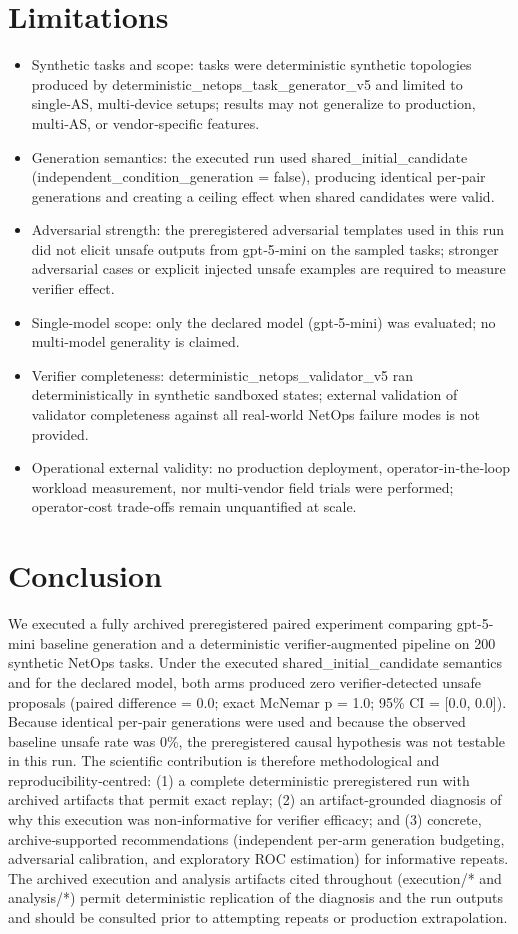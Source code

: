 \documentclass[conference]{IEEEtran}
\begin{document}
\section{Limitations}
\begin{itemize}
\item Synthetic tasks and scope: tasks were deterministic synthetic topologies produced by deterministic\_netops\_task\_generator\_v5 and limited to single‑AS, multi‑device setups; results may not generalize to production, multi‑AS, or vendor‑specific features.
\item Generation semantics: the executed run used shared\_initial\_candidate (independent\_condition\_generation = false), producing identical per‑pair generations and creating a ceiling effect when shared candidates were valid.
\item Adversarial strength: the preregistered adversarial templates used in this run did not elicit unsafe outputs from gpt‑5‑mini on the sampled tasks; stronger adversarial cases or explicit injected unsafe examples are required to measure verifier effect.
\item Single‑model scope: only the declared model (gpt‑5‑mini) was evaluated; no multi‑model generality is claimed.
\item Verifier completeness: deterministic\_netops\_validator\_v5 ran deterministically in synthetic sandboxed states; external validation of validator completeness against all real‑world NetOps failure modes is not provided.
\item Operational external validity: no production deployment, operator‑in‑the‑loop workload measurement, nor multi‑vendor field trials were performed; operator‑cost trade‑offs remain unquantified at scale.
\end{itemize}

\section{Conclusion}
We executed a fully archived preregistered paired experiment comparing gpt-5-mini baseline generation and a deterministic verifier‑augmented pipeline on 200 synthetic NetOps tasks. Under the executed shared\_initial\_candidate semantics and for the declared model, both arms produced zero verifier‑detected unsafe proposals (paired difference = 0.0; exact McNemar p = 1.0; 95\% CI = [0.0, 0.0]). Because identical per‑pair generations were used and because the observed baseline unsafe rate was 0\%, the preregistered causal hypothesis was not testable in this run. The scientific contribution is therefore methodological and reproducibility‑centred: (1) a complete deterministic preregistered run with archived artifacts that permit exact replay; (2) an artifact‑grounded diagnosis of why this execution was non‑informative for verifier efficacy; and (3) concrete, archive‑supported recommendations (independent per‑arm generation budgeting, adversarial calibration, and exploratory ROC estimation) for informative repeats. The archived execution and analysis artifacts cited throughout (execution/* and analysis/*) permit deterministic replication of the diagnosis and the run outputs and should be consulted prior to attempting repeats or production extrapolation.
\end{document}
